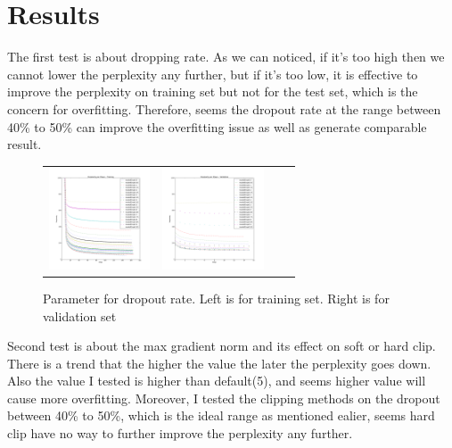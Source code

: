 \documentclass{article}
\begin{document}
\section{Results}
The first test is about dropping rate. As we can noticed, if it's too high then we cannot lower the perplexity any further, but if it's too low, it is effective to improve the perplexity on training set but not for the test set, which is the concern for overfitting. Therefore, seems the dropout rate at the range between 40\% to 50\% can improve the overfitting issue as well as generate comparable result.
\begin{figure}[h]
\centering
\begin{subfigure}
  \begin{tabular}{cccc}
  {\includegraphics[width = 30mm]{../lstm_me/fig/Drop_train.png}}&
  {\includegraphics[width = 30mm]{../lstm_me/fig/Drop_val.png}}
  \end{tabular}
\end{subfigure}
\caption{Parameter for dropout rate. Left is for training set. Right is for validation set}
\end{figure}

Second test is about the max gradient norm and its effect on soft or hard clip. There is a trend that the higher the value the later the perplexity goes down. Also the value I tested is higher than default(5), and seems higher value will cause more overfitting. Moreover, I tested the clipping methods on the dropout between 40\% to 50\%, which is the ideal range as mentioned ealier, seems hard clip have no way to further improve the perplexity any further.
\end{document}
